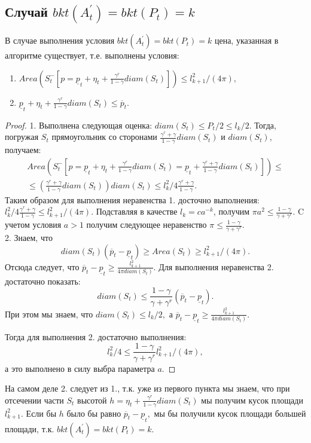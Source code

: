 \documentclass[12 pt, russian]{article}
\begin{document}
\subsection{Случай $bkt(A^{'}_t) = bkt(P_t) = k$}
\statement
В случае выполнения условия $bkt(A^{'}_t) = bkt(P_t) = k$ цена, указанная в алгоритме существует, т.е. выполнены условия:
\begin{enumerate}
    \item $Area(S^{-}_t[p = \underline{p}_t + \eta_t + \frac{\gamma^r}{1 - \gamma}diam(S_t)]) \leq l^2_{k + 1} / (4 \pi),$
    \item $\underline{p}_t + \eta_t + \frac{\gamma^r}{1 - \gamma}diam(S_t) \leq \overline{p}_t.$
\end{enumerate}
\begin{proof}
1. Выполнена следующая оценка: $diam(S_t) \leq P_t / 2 \leq l_k / 2.$ Тогда, погружая $S_t$  прямоугольник со сторонами $\frac{\gamma^r + \gamma}{1 - \gamma}diam(S_t)$ и $diam(S_t)$, получаем:
\begin{gather*}
Area(S^{-}_t[p = \underline{p}_t + \eta_t + \frac{\gamma^r}{1 - \gamma}diam(S_t) = \underline{p}_t + \frac{\gamma^r + \gamma}{1 - \gamma}diam(S_t)]) \leq \\ \leq  (\frac{\gamma^r + \gamma}{1 - \gamma}diam(S_t)) diam(S_t) \leq l^2_k / 4 \frac{\gamma^r + \gamma}{1 - \gamma}.  
\end{gather*}
Таким образом для выполнения неравенства 1. досточно выполнения:
$l^2_k / 4 \frac{\gamma^r + \gamma}{1 - \gamma} \leq l^2_{k + 1} / (4 \pi).$ Подставляя в качестве $l_k = c a^{-k}$, получим $\pi a^2 \leq \frac{1 - \gamma}{\gamma + \gamma^r}.$ C учетом условия $a > 1$ получим следующее неравенство $\pi \leq \frac{1 - \gamma}{\gamma + \gamma^r}.$
\\
2. Знаем, что 
$$diam(S_t)(\overline{p}_t - \underline{p}_t) \geq Area(S_t) \geq l^2_{k + 1} / (4 \pi).$$ 
Отсюда следует, что $\overline{p}_t - \underline{p}_t \geq \frac{l^2_{k + 1}}{4 \pi diam(S_t)}.$
Для выполнения неравенства 2. достаточно показать:
$$diam(S_t) \leq \frac{1 - \gamma}{\gamma + \gamma^r}(\overline{p}_t - \underline{p}_t).$$
При этом мы знаем, что $diam(S_t) \leq l_k / 2,$ а $\overline{p}_t - \underline{p}_t \geq \frac{l^2_{k + 1}}{4 \pi diam(S_t)}$.

Тогда для выполнения 2. достаточно выполнения:
$$l^2_k / 4 \leq \frac{1 - \gamma}{\gamma + \gamma^r}l^{2}_{k + 1} / (4 \pi),$$
а это выполнено в силу выбра параметра $a$.
\end{proof}

\remark
На самом деле 2. следует из 1., т.к. уже из первого пункта мы знаем, что при отсечении части $S_t$ высотой $h = \eta_t + \frac{\gamma^r}{1 - \gamma} diam(S_t)$ мы получим кусок площади $l^2_{k + 1}$. Если бы $h$ было бы равно $\overline{p}_t - \underline{p}_t,$ мы бы получили кусок площади большей площади, т.к. $bkt(A^{'}_t) = bkt(P_t) = k.$
\end{document}
